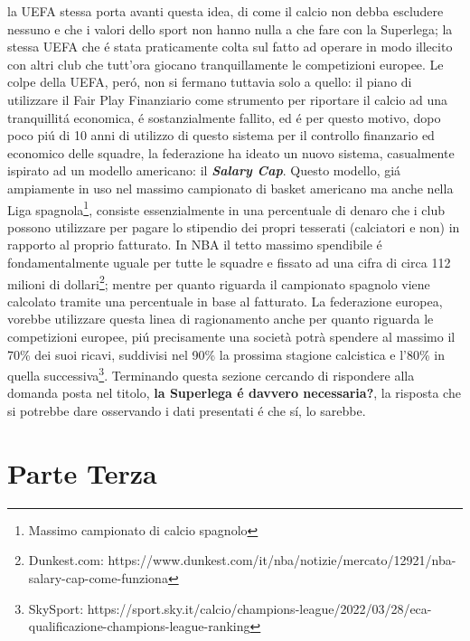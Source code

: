 \documentclass[
    corpo=12pt,
    oneside,
    evenboxes,
    tipotesi=triennale,
    stile=classica,
    oldstyle,
    autoretitolo,
    greek,
]{toptesi}
\begin{document}
\begin{interlinea}{1.5}
la UEFA stessa porta avanti questa idea, di come il calcio non debba escludere nessuno e che i valori dello sport non hanno nulla a che fare con la 
Superlega; la stessa UEFA che \'e stata praticamente colta sul fatto ad operare in modo illecito con altri club che tutt'ora giocano tranquillamente
le competizioni europee. Le colpe della UEFA, per\'o, non si fermano tuttavia solo a quello: il piano di utilizzare il Fair Play Finanziario come 
strumento per riportare il calcio ad una tranquillit\'a economica, \'e sostanzialmente fallito, ed \'e per questo motivo, dopo poco pi\'u di 
10 anni di utilizzo di questo sistema per il controllo finanzario ed economico delle squadre, la federazione ha ideato un nuovo sistema, 
casualmente ispirato ad un modello americano: il \textbf{\emph{Salary Cap}}. Questo modello, gi\'a ampiamente in uso nel massimo campionato di 
basket americano ma anche nella Liga spagnola\footnote{Massimo campionato di calcio spagnolo}, consiste essenzialmente in una percentuale di denaro che i
club possono utilizzare per pagare lo stipendio dei propri tesserati (calciatori e non) in rapporto al proprio fatturato. In NBA il tetto 
massimo spendibile \'e fondamentalmente uguale per tutte le squadre e fissato ad una cifra di circa 112 milioni di dollari\footnote{Dunkest.com: https://www.dunkest.com/it/nba/notizie/mercato/12921/nba-salary-cap-come-funziona};
mentre per quanto riguarda il campionato spagnolo viene calcolato tramite una percentuale in base al fatturato. La federazione europea, vorebbe 
utilizzare questa linea di ragionamento anche per quanto riguarda le competizioni europee, pi\'u precisamente una società potrà spendere al massimo il 70\% dei suoi ricavi, 
suddivisi nel 90\% la prossima stagione calcistica e l'80\% in quella successiva\footnote{SkySport: https://sport.sky.it/calcio/champions-league/2022/03/28/eca-qualificazione-champions-league-ranking}.\newline
Terminando questa sezione cercando di rispondere alla domanda posta nel titolo, \textbf{la Superlega \'e davvero necessaria?}, la risposta che si potrebbe
dare osservando i dati presentati \'e che s\'i, lo sarebbe. 
\part{Parte Terza}

\end{interlinea}
\end{document}
